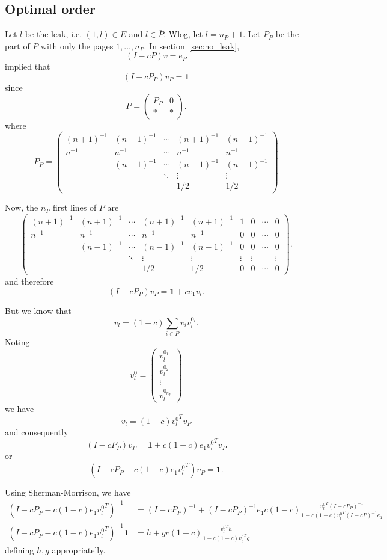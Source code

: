 \documentclass{article}
\newcommand{\1}{\mathbf{1}}
\theoremstyle{definition}
\begin{document}
\subsection{Optimal order}
Let $l$ be the leak, i.e. $(1,l) \in E$ and $l \in \bar{P}$.
Wlog, let $l = n_{P}+1$.
Let $P_P$ be the part of $P$ with only the pages $1, \ldots, n_P$.
In section~\ref{sec:no_leak},
\[ (I - cP)v = e_P \]
implied that
\[ (I - cP_P)v_P = \1 \]
since
\[ P =
  \begin{pmatrix}
    P_P & 0\\
    * & *
  \end{pmatrix}.
\]
where
\[
  P_P =
  \begin{pmatrix}
    (n+1)^{-1} & (n+1)^{-1} & \cdots & (n+1)^{-1} & (n+1)^{-1}\\
    n^{-1} & n^{-1} & \cdots & n^{-1} & n^{-1}\\
           & (n-1)^{-1} & \cdots & (n-1)^{-1} & (n-1)^{-1}\\
           & & \ddots & \vdots & \vdots\\
    & & & 1/2 & 1/2
  \end{pmatrix}
\]

Now, the $n_P$ first lines of $P$ are
\[
  \begin{pmatrix}
    (n+1)^{-1} & (n+1)^{-1} & \cdots & (n+1)^{-1} & (n+1)^{-1} & 1 & 0 & \cdots & 0\\
    n^{-1} & n^{-1} & \cdots & n^{-1} & n^{-1} & 0 & 0 & \cdots & 0\\
           & (n-1)^{-1} & \cdots & (n-1)^{-1} & (n-1)^{-1} & 0 & 0 & \cdots & 0\\
           & & \ddots & \vdots & \vdots & \vdots & \vdots & & \vdots \\
           & & & 1/2 & 1/2 & 0 & 0 & \cdots & 0
  \end{pmatrix}.
\]
and therefore
\[ (I - cP_P)v_P = \1 + c e_1 v_l. \]

But we know that
\[ v_l = (1-c) \sum_{i \in P} v_i v_l^{0_i}. \]
Noting
\[ v_l^0 =
  \begin{pmatrix}
    v_l^{0_1} \\ v_l^{0_2} \\ \vdots \\ v_l^{0_{n_P}}
  \end{pmatrix}
\]
we have
\[ v_l = (1-c) {v_l^0}^T v_P \]
and consequently
\[ (I - cP_P)v_P = \1 + c (1-c) e_1 {v_l^0}^T v_P \]
or
\[ (I - cP_P - c (1-c) e_1 {v_l^0}^T)v_P = \1. \]

Using Sherman-Morrison, we have
\begin{align*}
  (I - cP_P - c (1-c) e_1 {v_l^0}^T)^{-1} & = (I - cP_P)^{-1} + (I - cP_P)^{-1}e_1 c(1-c) \frac{{v_l^0}^T(I-cP_P)^{-1}}{1 - c(1-c){v_l^0}^T(I-cP)^{-1}e_1}\\
  (I - cP_P - c (1-c) e_1 {v_l^0}^T)^{-1}\1 & = h + g c(1-c) \frac{{v_l^0}^Th}{1 - c(1-c){v_l^0}^Tg}
\end{align*}
defining $h,g$ appropriatelly.
\end{document}

